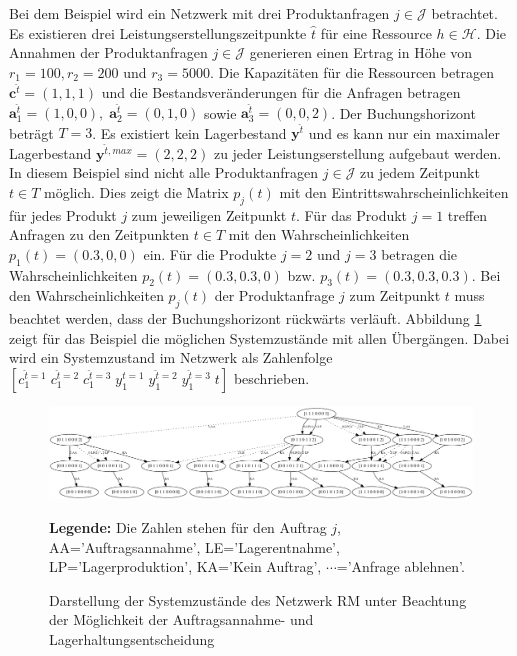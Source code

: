 Bei dem Beispiel wird ein Netzwerk mit drei Produktanfragen $j\in\mathcal{J}$ betrachtet. Es existieren drei Leistungserstellungszeitpunkte $\hat t$ für eine Ressource $h\in\mathcal{H}$. Die Annahmen der Produktanfragen $j\in\mathcal{J}$ generieren einen Ertrag in Höhe von $r_1=100, r_2=200$ und $r_3=5000$. Die Kapazitäten für die Ressourcen betragen $\textbf{c}^{\hat t}=(1,1,1)$ und die Bestandsveränderungen für die Anfragen betragen $\textbf{a}^{\hat t}_1=(1,0,0),\; \textbf{a}^{\hat t}_2=(0,1,0)$ sowie $\textbf{a}^{\hat t}_3=(0,0,2)$. Der Buchungshorizont beträgt $T=3$. Es existiert kein Lagerbestand $\textbf{y}^{\hat t}$ und es kann nur ein maximaler Lagerbestand $\textbf{y}^{\hat t, max}=(2, 2, 2)$ zu jeder Leistungserstellung aufgebaut werden. In diesem Beispiel sind nicht alle Produktanfragen $j\in\mathcal{J}$ zu jedem Zeitpunkt $t\in T$ möglich. Dies zeigt die Matrix $p_{j}(t)$ mit den Eintrittswahrscheinlichkeiten für jedes Produkt $j$ zum jeweiligen Zeitpunkt $t$. Für das Produkt $j=1$ treffen Anfragen zu den Zeitpunkten $t\in T$ mit den Wahrscheinlichkeiten $p_{1}(t)=(0.3, 0, 0)$ ein. Für die Produkte $j=2$ und $j=3$ betragen die Wahrscheinlichkeiten $p_{2}(t)=(0.3, 0.3, 0)$ bzw. $p_{3}(t)=(0.3, 0.3, 0.3)$. Bei den Wahrscheinlichkeiten $p_j(t)$ der Produktanfrage $j$ zum Zeitpunkt $t$ muss beachtet werden, dass der Buchungshorizont rückwärts verläuft. Abbildung \ref{B9} zeigt für das Beispiel die möglichen Systemzustände mit allen Übergängen. Dabei wird ein Systemzustand im Netzwerk als Zahlenfolge $[c^{\hat t=1}_1\;c^{\hat t=2}_1\;c_1^{\hat t=3}\;y_1^{\hat t=1}\;y_1^{\hat t=2}\;y_1^{\hat t=3}\;t]$ beschrieben.

\begin{figure}[h!]
  \begin{center}
    \includegraphics[width=200mm, angle=90]{Bilder/Beispiel9.pdf}
    \caption{Darstellung der Systemzustände des Netzwerk RM unter Beachtung der Möglichkeit der Auftragsannahme- und Lagerhaltungsentscheidung}  \label{B9}
    {\footnotesize \textbf{Legende:} Die Zahlen stehen für den Auftrag $j$, AA='Auftragsannahme', LE='Lagerentnahme', LP='Lagerproduktion', KA='Kein Auftrag', $\cdots$='Anfrage ablehnen'.} 
  \end{center}
\end{figure}

